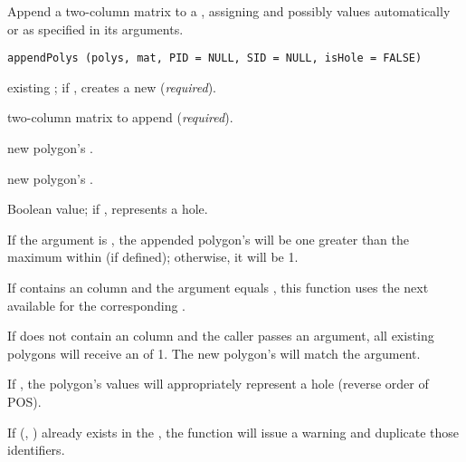 \documentclass[letterpaper]{book}
\begin{document}
%
\begin{Description}\relax
Append a two-column matrix to a , assigning  and
possibly  values automatically or as specified in its
arguments.
\end{Description}
%
\begin{Usage}
\begin{verbatim}
appendPolys (polys, mat, PID = NULL, SID = NULL, isHole = FALSE)
\end{verbatim}
\end{Usage}
%
\begin{Arguments}
\begin{ldescription}
\item[\code{polys}] existing ; if , creates a new
 (\emph{required}).
\item[\code{mat}] two-column matrix to append (\emph{required}).
\item[\code{PID}] new polygon's .
\item[\code{SID}] new polygon's .
\item[\code{isHole}] Boolean value; if ,  represents a
hole.
\end{ldescription}
\end{Arguments}
%
\begin{Details}\relax
If the  argument is , the appended polygon's
 will be one greater than the maximum within 
(if defined); otherwise, it will be 1.

If  contains an  column and the 
argument equals , this function uses the next available
 for the corresponding .

If  does not contain an  column and the
caller passes an  argument, all existing polygons will
receive an  of 1.  The new polygon's  will
match the  argument.

If , the polygon's  values will
appropriately represent a hole (reverse order of POS).

If (, ) already exists in the , the
function will issue a warning and duplicate those identifiers.
\end{Details}
\end{document}

